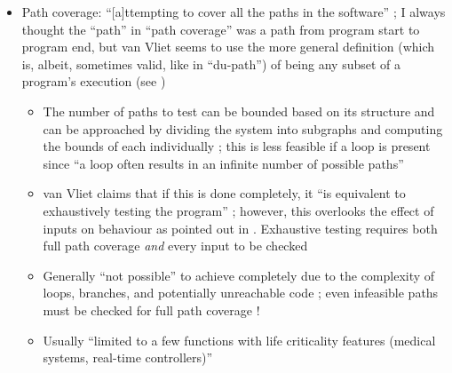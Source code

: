 \begin{itemize}
\begin{itemize}
            \end{itemize}
      \item Path coverage: ``[a]ttempting to cover all the paths in the
            software'' \cite[p.~119]{patton_software_2006};
            I always thought the ``path'' in ``path coverage'' was
            a path from program start to program end, but van
            Vliet seems to use the more general definition (which
            is, albeit, sometimes valid, like in ``du-path'') of
            being any subset of a program's execution (see
            \cite[p.~420]{van_vliet_software_2000})
            \begin{itemize}
                  \item The number of paths to test can be bounded based on its
                        structure and can be approached by dividing the system
                        into subgraphs and computing the bounds of each
                        individually \cite[pp.~471-473]{peters_software_2000};
                        this is less feasible if a loop is present
                        \cite[pp.~473-476]{peters_software_2000} since ``a loop
                        often results in an infinite number of possible paths''
                        \cite[p.~421]{van_vliet_software_2000}
                  \item van Vliet claims that if this is done completely, it
                        ``is equivalent to exhaustively testing the program''
                        \cite[p.~421]{van_vliet_software_2000};
                        however, this overlooks the effect of inputs on
                        behaviour as pointed out in
                        \cite[pp.~466-467]{peters_software_2000}. Exhaustive
                        testing requires both full path coverage \emph{and}
                        every input to be checked
                  \item Generally ``not possible'' to achieve completely due to
                        the complexity of
                        loops, branches, and potentially unreachable code
                        \cite[p.~421]{van_vliet_software_2000}; even infeasible
                        paths must be checked for full path coverage
                        \cite[p.~439]{peters_software_2000}!
                  \item Usually ``limited to a few functions with life
                        criticality features (medical systems, real-time
                        controllers)'' \cite[p.~481]{peters_software_2000}

\end{itemize}
\end{itemize}
